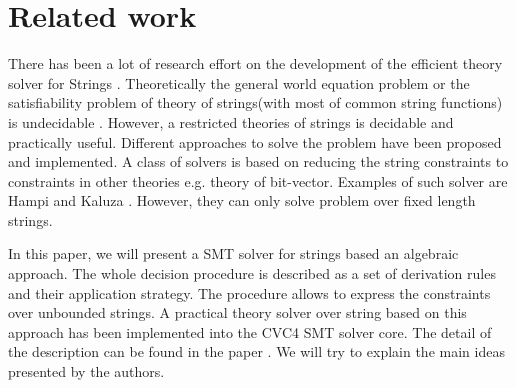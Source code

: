 \section{Related work}
\label{sec:Related work}

There has been a lot of research effort on the development of the efficient theory solver for Strings \cite{misc_89}. Theoretically the general world equation problem or the satisfiability problem of theory of strings(with most of common string functions) is undecidable \cite{misc_17}. However, a restricted theories of strings is decidable and practically useful. Different approaches to solve the problem have been proposed and implemented. A class of solvers is based on reducing the string constraints to constraints in other theories e.g. theory of bit-vector. Examples of such solver are Hampi \cite{hampi} and Kaluza \cite{Kaluza}. However, they can only solve problem over fixed length strings. 

In this paper, we will present a SMT solver for strings based an algebraic approach. The whole decision procedure is described as a set of derivation rules and their application strategy. The procedure allows to express the constraints over unbounded strings. A practical theory solver over string based on this approach has been implemented into the CVC4 SMT solver\cite{cvc4_website} core. The detail of the description can be found in the paper \cite{main-paper}. We will try to explain the main ideas presented by the authors.